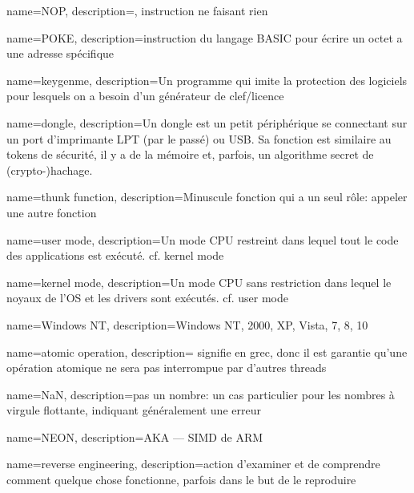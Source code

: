 {
  name=NOP,
  description={, instruction ne faisant rien}
}

{
  name=POKE,
  description={instruction du langage BASIC pour écrire un octet a une adresse spécifique}
}

{
  name=keygenme,
  description={Un programme qui imite la protection des logiciels pour lesquels on a besoin d'un générateur de clef/licence}
} %

{
  name=dongle,
  description={Un dongle est un petit périphérique se connectant sur un port d'imprimante LPT (par le passé) ou USB.
  Sa fonction est similaire au tokens de sécurité, il y a de la mémoire et, parfois, un algorithme secret de (crypto-)hachage.}
}

{
  name=thunk function,
  description={Minuscule fonction qui a un seul rôle: appeler une autre fonction}
}

{
  name=user mode,
  description={Un mode CPU restreint dans lequel tout le code des applications est exécuté. cf. \gls{kernel mode}}
}

{
  name=kernel mode,
  description={Un mode CPU sans restriction dans lequel le noyaux de l'OS et les drivers sont exécutés. cf. \gls{user mode}}
}

{
  name=Windows NT,
  description={Windows NT, 2000, XP, Vista, 7, 8, 10}
}

{
  name=atomic operation,
  description={
  signifie  en grec, donc il est garantie qu'une opération atomique ne sera pas interrompue par d'autres threads}
}

{
  name=NaN,
  description={pas un nombre: un cas particulier pour les nombres à virgule flottante, indiquant généralement une erreur}
}

{
  name=NEON,
  description={\ac{AKA}  --- \ac{SIMD} de ARM}
}

{
  name=reverse engineering,
  description={action d'examiner et de comprendre comment quelque chose fonctionne, parfois dans le but de le reproduire}
}

